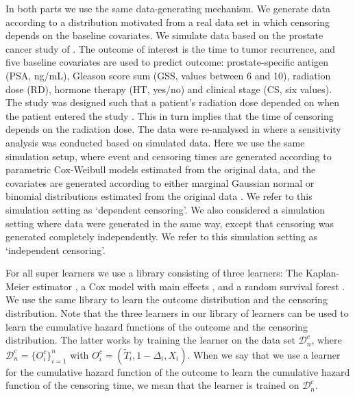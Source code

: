 \documentclass[a4paper,danish]{article}
\theoremstyle{plain} %
\numberwithin{theorem}{section}
\theoremstyle{definition} %
\theoremstyle{remark}
\newcommand{\1}{\mathds{1}}
\newcommand{\data}{\ensuremath{\mathcal{D}}}
\begin{document}
In both parts we use the same data-generating mechanism. We generate data
according to a distribution motivated from a real data set in which censoring
depends on the baseline covariates. We simulate data based on the prostate
cancer study of \cite{kattan2000pretreatment}. The outcome of interest is the
time to tumor recurrence, and five baseline covariates are used to predict
outcome: prostate-specific antigen (PSA, ng/mL), Gleason score sum (GSS, values
between 6 and 10), radiation dose (RD), hormone therapy (HT, yes/no) and
clinical stage (CS, six values). The study was designed such that a patient's
radiation dose depended on when the patient entered the study
\citep{gerds2013estimating}. This in turn implies that the time of censoring
depends on the radiation dose. The data were re-analysed in
\citep{gerds2013estimating} where a sensitivity analysis was conducted based on
simulated data. Here we use the same simulation setup, where event and censoring
times are generated according to parametric Cox-Weibull models estimated from
the original data, and the covariates are generated according to either marginal
Gaussian normal or binomial distributions estimated from the original data
\citep[c.f.,][Section~4.6]{gerds2013estimating}. We refer to this simulation
setting as `dependent censoring'. We also considered a simulation setting where
data were generated in the same way, except that censoring was generated
completely independently. We refer to this simulation setting as `independent
censoring'.

For all super learners we use a library consisting of three
learners: The Kaplan-Meier estimator
\citep{kaplan1958nonparametric,Gerds_2019prodlim}, a Cox model
with main effects \citep{cox1972regression, survival-package},
and a random survival forest
\citep{ishwaran2008random,rfsrc-paclage}. We use the same
library to learn the outcome distribution and the censoring
distribution. Note that the three learners in our library of
learners can be used to learn the cumulative hazard functions
of the outcome and the censoring distribution. The latter
works by training the learner on the data set \( \data_n^c \),
where \( \data_n^c = \{O_i^c\}_{i=1}^n \) with
\( O_i^c = (\tilde{T}_i, 1-\Delta_i, X_i) \). When we say that
we use a learner for the cumulative hazard function of the
outcome to learn the cumulative hazard function of the
censoring time, we mean that the learner is trained on
\( \data_n^c \).
\end{document}
